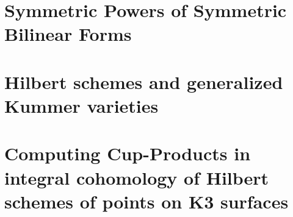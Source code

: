 \documentclass[11pt,twoside]{article}
\newcommand{\chapter}[1]{}
\begin{document}

\newpage
\part{Symmetric Powers of Symmetric Bilinear Forms}

\newpage
\part{Hilbert schemes and generalized Kummer varieties}
\chapter{Cohomology of Hilbert schemes of points on surfaces}






\label{integralcohomology}
\chapter{Cohomology of generalized Kummer manifolds}




\chapter{A quotient of the generalized Kummer fourfold}

\newpage
\part{Computing Cup-Products in integral cohomology of Hilbert schemes of points on K3 surfaces}
\chapter{Integral cohomology of \texorpdfstring{$S\hilb{n}$}{S[n]}}



\appendix
\chapter{Source code}

\clearpage

\clearpage

\newpage

\end{document}
